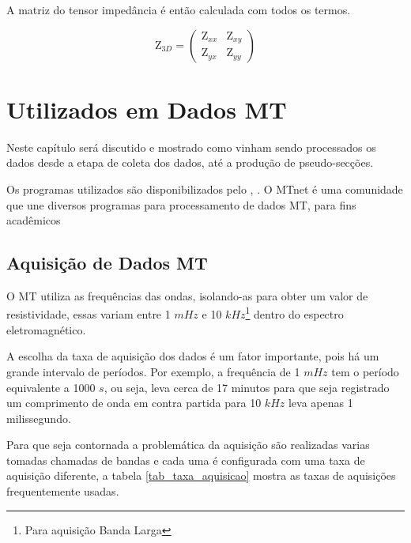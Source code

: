 	    A matriz do tensor impedância é então calculada com todos os termos. 
	    
	     \begin{equation}
	     \textrm{Z}_{3D} = \left (\begin{array}{cc}
	                               \textrm{Z}_{xx} & \textrm{Z}_{xy} \\
	                               \textrm{Z}_{yx} & \textrm{Z}_{yy}
	                              \end{array} \right)
	    \end{equation}

    \chapter{ Utilizados em Dados MT}
        \label{cap-proc_mt}
            
        Neste capítulo será discutido e mostrado como vinham sendo processados os dados \MT desde a etapa de coleta dos dados, até a produção de pseudo-secções. 
        
        Os programas utilizados são disponibilizados pelo  \citeauthor{mtnet}, \citeyearpar{mtnet}. O  MTnet é uma comunidade que une diversos programas para processamento de dados MT, para fins acadêmicos  
        
    \section{Aquisição de Dados MT}
        \label{sec_aquisicao_dados}
        O MT utiliza as frequências das ondas, isolando-as para obter um valor de resistividade, essas variam entre 1 $mHz$ e 10 $kHz$\footnote{Para aquisição Banda Larga} dentro do espectro eletromagnético.
        
        A escolha da taxa de aquisição dos dados é um fator importante, pois há um grande intervalo de períodos. Por exemplo, a frequência de 1 $mHz$ tem o período equivalente a 1000 $s$, ou seja, leva cerca de 17 minutos para que seja registrado um comprimento de onda em contra partida para 10 $kHz$ leva apenas 1 milissegundo.
        
        Para que seja contornada a problemática da aquisição são realizadas varias tomadas chamadas de bandas e cada uma é configurada com uma taxa de aquisição diferente, a tabela \ref{tab_taxa_aquisicao} mostra as taxas de aquisições frequentemente usadas. 
        
